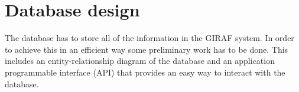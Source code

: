 \section{Database design}
The database has to store all of the information in the GIRAF system. In order to achieve this in an efficient way some preliminary work has to be done. This includes an entity-relationship diagram of the database and an application programmable interface (API) that provides an easy way to interact with the database. 